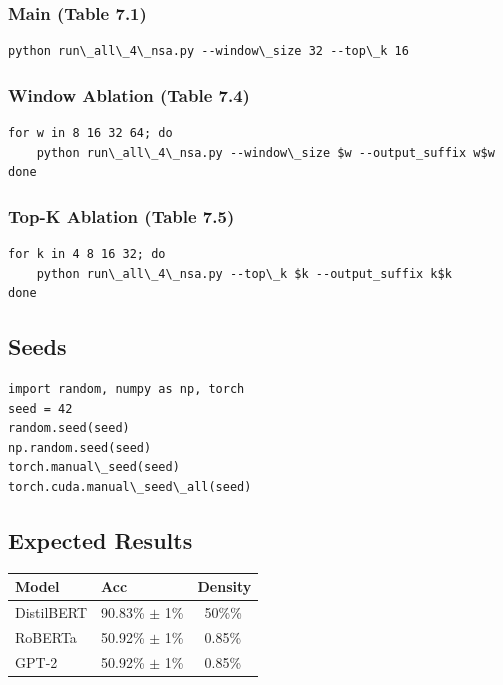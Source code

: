 \subsubsection{Main (Table 7.1)}
\begin{lstlisting}
python run\_all\_4\_nsa.py --window\_size 32 --top\_k 16
\end{lstlisting}

\subsubsection{Window Ablation (Table 7.4)}
\begin{lstlisting}
for w in 8 16 32 64; do
    python run\_all\_4\_nsa.py --window\_size $w --output_suffix w$w
done
\end{lstlisting}

\subsubsection{Top-K Ablation (Table 7.5)}
\begin{lstlisting}
for k in 4 8 16 32; do
    python run\_all\_4\_nsa.py --top\_k $k --output_suffix k$k
done
\end{lstlisting}

\subsection{Seeds}

\begin{lstlisting}
import random, numpy as np, torch
seed = 42
random.seed(seed)
np.random.seed(seed)
torch.manual\_seed(seed)
torch.cuda.manual\_seed\_all(seed)
\end{lstlisting}

\subsection{Expected Results}

\begin{table}[H]
\centering
\small
\begin{tabular}{lll}
\toprule
\textbf{Model} & \textbf{Acc} & \textbf{Density} \\
\midrule
DistilBERT & 90.83\% $\pm$ 1\% & ~50\%\% \\
RoBERTa & 50.92\% $\pm$ 1\% & ~0.85\% \\
GPT-2 & 50.92\% $\pm$ 1\% & ~0.85\% \\
\bottomrule
\end{tabular}
\end{table}

